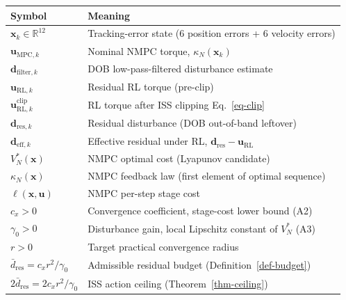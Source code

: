 \documentclass[
  11pt,
]{article}
\newcounter{none} %
\theoremstyle{plain}
\theoremstyle{plain}
\theoremstyle{definition}
\theoremstyle{remark}
\begin{document}
{\def\LTcaptype{none} %
\begin{longtable}[]{@{}
  >{\raggedright\arraybackslash}p{}
  >{\raggedright\arraybackslash}p{}@{}}
\toprule\noalign{}
\begin{minipage}[b]{\linewidth}\raggedright
Symbol
\end{minipage} & \begin{minipage}[b]{\linewidth}\raggedright
Meaning
\end{minipage} \\
\midrule\noalign{}
\endhead
\bottomrule\noalign{}
\endlastfoot
\(\bm{x}_k \in \mathbb{R}^{12}\) & Tracking-error state (6 position
errors + 6 velocity errors) \\
\(\bm{u}_{\mathrm{MPC},k}\) & Nominal NMPC torque,
\(\kappa_N(\bm{x}_k)\) \\
\(\bm{d}_{\mathrm{filter},k}\) & DOB low-pass-filtered disturbance
estimate \\
\(\bm{u}_{\mathrm{RL},k}\) & Residual RL torque (pre-clip) \\
\(\bm{u}_{\mathrm{RL},k}^{\mathrm{clip}}\) & RL torque after ISS
clipping Eq.~\ref{eq-clip} \\
\(\bm{d}_{\mathrm{res},k}\) & Residual disturbance (DOB out-of-band
leftover) \\
\(\bm{d}_{\mathrm{eff},k}\) & Effective residual under RL,
\(\bm{d}_{\mathrm{res}}-\bm{u}_{\mathrm{RL}}\) \\
\(V_N^*(\bm{x})\) & NMPC optimal cost (Lyapunov candidate) \\
\(\kappa_N(\bm{x})\) & NMPC feedback law (first element of optimal
sequence) \\
\(\ell(\bm{x},\bm{u})\) & NMPC per-step stage cost \\
\(c_x > 0\) & Convergence coefficient, stage-cost lower bound (A2) \\
\(\gamma_0 > 0\) & Disturbance gain, local Lipschitz constant of
\(V_N^*\) (A3) \\
\(r > 0\) & Target practical convergence radius \\
\(\bar{d}_{\mathrm{res}} = c_x r^2/\gamma_0\) & Admissible residual
budget (Definition~\ref{def-budget}) \\
\(2\bar{d}_{\mathrm{res}} = 2c_x r^2/\gamma_0\) & ISS action ceiling
(Theorem~\ref{thm-ceiling}) \\
\end{longtable}
}
\end{document}
